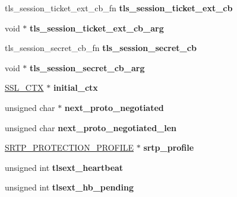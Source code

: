 \begin{DoxyCompactItemize}
\item 
\mbox{\label{structssl__st_adfbd96d1abce945f541c432379fc994f}} 
tls\+\_\+session\+\_\+ticket\+\_\+ext\+\_\+cb\+\_\+fn {\bfseries tls\+\_\+session\+\_\+ticket\+\_\+ext\+\_\+cb}
\item 
\mbox{\label{structssl__st_a45dd63c101fc5b96773ab292285962a4}} 
void $\ast$ {\bfseries tls\+\_\+session\+\_\+ticket\+\_\+ext\+\_\+cb\+\_\+arg}
\item 
\mbox{\label{structssl__st_aff0b13d0e1261db9771d7cf0e64cc5cc}} 
tls\+\_\+session\+\_\+secret\+\_\+cb\+\_\+fn {\bfseries tls\+\_\+session\+\_\+secret\+\_\+cb}
\item 
\mbox{\label{structssl__st_a3e4db63ea16d50062c8b2b062bb648d9}} 
void $\ast$ {\bfseries tls\+\_\+session\+\_\+secret\+\_\+cb\+\_\+arg}
\item 
\mbox{\label{structssl__st_a704ffea820953b3ca385ce14e6efe570}} 
\hyperlink{structssl__ctx__st}{S\+S\+L\+\_\+\+C\+TX} $\ast$ {\bfseries initial\+\_\+ctx}
\item 
\mbox{\label{structssl__st_aef796f12c3e90c045baad0cd1841e180}} 
unsigned char $\ast$ {\bfseries next\+\_\+proto\+\_\+negotiated}
\item 
\mbox{\label{structssl__st_aa530fc5efd1d6b0f5f881dbd78b6d3de}} 
unsigned char {\bfseries next\+\_\+proto\+\_\+negotiated\+\_\+len}
\item 
\mbox{\label{structssl__st_ae8776b7b0b446fb823d9f87176bcfa1d}} 
\hyperlink{structsrtp__protection__profile__st}{S\+R\+T\+P\+\_\+\+P\+R\+O\+T\+E\+C\+T\+I\+O\+N\+\_\+\+P\+R\+O\+F\+I\+LE} $\ast$ {\bfseries srtp\+\_\+profile}
\item 
\mbox{\label{structssl__st_a8ad372425499d47c2254c89fbcd0deed}} 
unsigned int {\bfseries tlsext\+\_\+heartbeat}
\item 
\mbox{\label{structssl__st_a2abf4f35ea6d829b809e2c7c82acdd1f}} 
unsigned int {\bfseries tlsext\+\_\+hb\+\_\+pending}
\item 

\end{DoxyCompactItemize}
